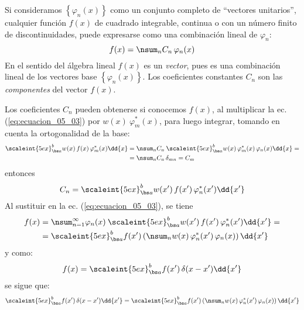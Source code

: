Si consideramos $\left\{ \varphi_{n} (x) \right\}$ como un conjunto completo de \enquote{vectores unitarios}, cualquier función $f(x)$ de cuadrado integrable, continua o con un número finito de discontinuidades, puede expresarse como una combinación lineal de $\varphi_{n}$:
\begin{equation}
f(x) = \nsum_{n} C_{n} \, \varphi_{n} (x)
\label{eq:ecuacion_05_03}
\end{equation}
En el sentido del álgebra lineal $f(x)$ es un \emph{vector}, pues es una combinación lineal de los vectores base $\left\{ \varphi_{n} (x) \right\}$. Los coeficientes constantes $C_{n}$ son las \emph{componentes} del vector $f(x)$.
\par
Los coeficientes $C_{n}$ pueden obtenerse si conocemos $f(x)$, al multiplicar la ec. (\ref{eq:ecuacion_05_03}) por $w(x) \: \varphi_{m}^{*} (x)$, para luego integrar, tomando en cuenta la ortogonalidad de la base:
\begin{align*}
\scaleint{5ex}_{\bs a}^{b} w(x) \, f(x) \, \varphi_{m}^{*} (x) \dd{x} &= \nsum_{n} C_{n} \: \scaleint{5ex}_{\bs a}^{b} w(x) \, \varphi_{m}^{*} (x) \, \varphi_{n} (x) \dd{x} = \\
&= \nsum_{n} C_{n} \, \delta_{mn} = C_{m}
\end{align*}
entonces
\begin{align*}
C_{n} = \scaleint{5ex}_{\bs a}^{b} w(x^{\prime}) \, f(x^{\prime}) \, \varphi_{n}^{*} (x^{\prime}) \dd{x^{\prime}}
\end{align*}
Al sustituir en la ec. (\ref{eq:ecuacion_05_03}), se tiene
\begin{align*}
f(x) &= \nsum_{n=1}^{\infty} \varphi_{n} (x) \: \scaleint{5ex}_{\bs a}^{b} w(x^{\prime}) \, f(x^{\prime}) \, \varphi_{n}^{*} (x^{\prime}) \dd{x^{\prime}} = \\
&= \scaleint{5ex}_{\bs a}^{b} f(x^{\prime}) \left( \nsum_{n} w(x) \, \varphi_{n}^{*} (x^{\prime}) \, \varphi_{n} (x) \right) \dd{x^{\prime}}
\end{align*}
y como:
\begin{align*}
f(x) = \scaleint{5ex}_{\bs a}^{b} f(x^{\prime}) \, \delta(x - x^{\prime}) \dd{x^{\prime}}
\end{align*}
se sigue que:
\begin{align*}
\scaleint{5ex}_{\bs a}^{b} f(x^{\prime}) \, \delta(x - x^{\prime}) \dd{x^{\prime}} = \scaleint{5ex}_{\bs a}^{b} f(x^{\prime}) \left( \nsum_{n} w(x) \, \varphi_{n}^{*} (x^{\prime}) \, \varphi_{n} (x) \right) \dd{x^{\prime}}
\end{align*}
